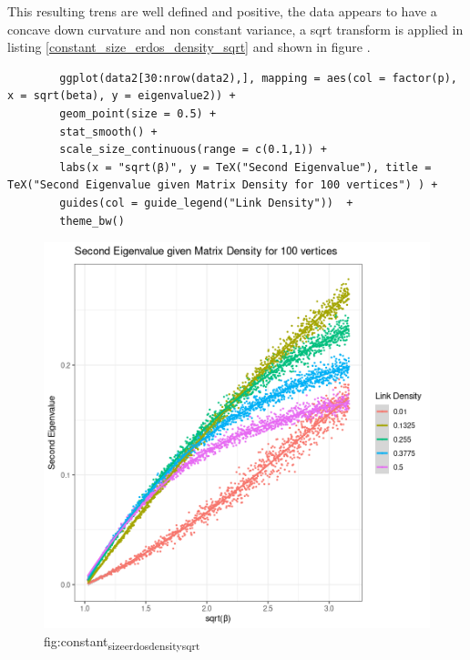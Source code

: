 \documentclass[11pt]{report}
\begin{document}
This resulting trens are well defined and positive, the data appears to have a
concave down curvature and non constant variance, a sqrt transform is applied in
listing \ref{constant_size_erdos_density_sqrt} and shown in figure .


\begin{listing}[htbp]
    \begin{tcolorbox}
        \begin{verbatim}
        ggplot(data2[30:nrow(data2),], mapping = aes(col = factor(p), x = sqrt(beta), y = eigenvalue2)) +
        geom_point(size = 0.5) +
        stat_smooth() +
        scale_size_continuous(range = c(0.1,1)) +
        labs(x = "sqrt(β)", y = TeX("Second Eigenvalue"), title = TeX("Second Eigenvalue given Matrix Density for 100 vertices") ) +
        guides(col = guide_legend("Link Density"))  +
        theme_bw()
        \end{verbatim}
    \end{tcolorbox}
\caption{\label{constant_size_erdos_density_sqrt}listing:constant\textsubscript{size}\textsubscript{erdos}\textsubscript{density}\textsubscript{sqrt}}
\end{listing}


\begin{figure}[htbp]
\centering
\includegraphics[width=12cm]{media/constant_size_erdos_density_sqrt.png}
\caption{\label{fig:constant_size_erdos_density_sqrt}fig:constant\textsubscript{size}\textsubscript{erdos}\textsubscript{density}\textsubscript{sqrt}}
\end{figure}
\end{document}
